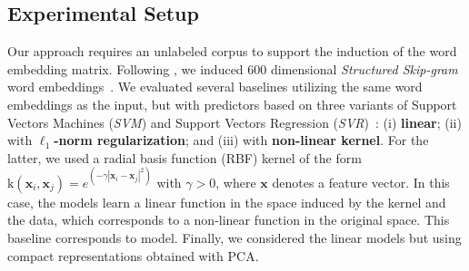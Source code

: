 \documentclass[letterpaper]{article}
\newcommand{\newcite}[1]{\citeauthor{#1} \shortcite{#1}}
\begin{document}
\begin{table}[!h]
\begin{center}
\end{center}
\caption{Lexicons}
\label{table:lexicons}
\end{table}
\subsection{Experimental Setup}

Our approach requires an unlabeled corpus to support the induction of the word embedding matrix. Following \newcite{Amir}, we induced 600 dimensional \textsl{Structured Skip-gram} word embeddings~\cite{ling-EtAl:2015:EMNLP2}. We evaluated several baselines utilizing the same word embeddings as the input, but with predictors based on three variants of Support Vectors Machines (\textsl{SVM}) and Support Vectors Regression (\textsl{SVR})~\cite{vapnik2000nature}: (i) \textbf{linear}; (ii) with \textbf{$\ell_1$-norm regularization}; and (iii) with \textbf{non-linear kernel}. For the latter, we used a radial basis function (RBF) kernel of the form ${\mathrm{k}(\mathbf{x}_i,\mathbf{x}_j) = e^{(-\gamma |\mathbf{x}_i-\mathbf{x}_j|^2)}}$ with $\gamma > 0$, where $\mathbf{x}$ denotes a feature vector. In this case, the models learn a linear function in the space induced by the kernel and the data, which corresponds to a non-linear function in the original space. This baseline corresponds to \newcite{Amir} model. Finally, we considered the linear models but using compact representations obtained with PCA.
\end{document}
